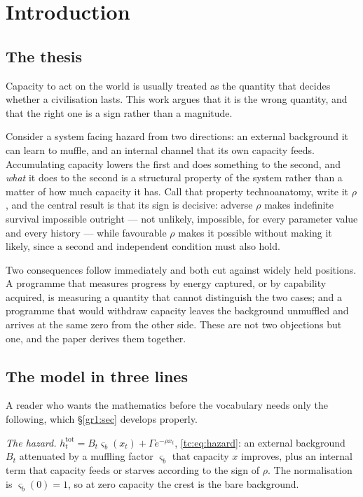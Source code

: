 \documentclass[11pt]{article}
\numberwithin{equation}{section}
\theoremstyle{plain}
\theoremstyle{definition}
\theoremstyle{remark}
\begin{document}

\section{Introduction}\label{intro:sec}

\subsection{The thesis}\label{intro:sub:thesis}

Capacity to act on the world is usually treated as the quantity that
decides whether a civilisation lasts. This work argues that it is the
wrong quantity, and that the right one is a sign rather than a magnitude.

Consider a system facing hazard from two directions: an external
background it can learn to muffle, and an internal channel that its own
capacity feeds. Accumulating capacity lowers the first and does something
to the second, and \emph{what} it does to the second is a structural
property of the system rather than a matter of how much capacity it has.
Call that property technoanatomy, write it $\rho$, and the central result
is that its sign is decisive: adverse $\rho$ makes indefinite survival
impossible outright --- not unlikely, impossible, for every parameter
value and every history --- while favourable $\rho$ makes it possible
without making it likely, since a second and independent condition must
also hold.

Two consequences follow immediately and both cut against widely held
positions. A programme that measures progress by energy captured, or by
capability acquired, is measuring a quantity that cannot distinguish the
two cases; and a programme that would withdraw capacity leaves the
background unmuffled and arrives at the same zero from the other side.
These are not two objections but one, and the paper derives them
together.

\subsection{The model in three lines}\label{intro:sub:model}

A reader who wants the mathematics before the vocabulary needs only the
following, which \S\ref{gr1:sec} develops properly.

\emph{The hazard.} $h^{\mathrm{tot}}_t=B_t\varsigma_b(x_t)+\Gamma
e^{-\rho x_t}$, \eqref{tc:eq:hazard}: an external background $B_t$
attenuated by a muffling factor $\varsigma_b$ that capacity $x$ improves,
plus an internal term that capacity feeds or starves according to the
sign of $\rho$. The normalisation is $\varsigma_b(0)=1$, so at zero
capacity the crest is the bare background.
\end{document}
